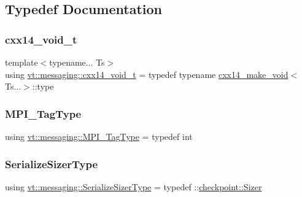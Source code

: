 \subsection{Typedef Documentation}
\mbox{\label{namespacevt_1_1messaging_a9724e719b301289eb8b3afbf9c44cf46}} 
\subsubsection{\texorpdfstring{cxx14\+\_\+void\+\_\+t}{cxx14\_void\_t}}
{\footnotesize\ttfamily template$<$typename... Ts$>$ \\
using \hyperlink{namespacevt_1_1messaging_a9724e719b301289eb8b3afbf9c44cf46}{vt\+::messaging\+::cxx14\+\_\+void\+\_\+t} = typedef typename \hyperlink{structvt_1_1messaging_1_1cxx14__make__void}{cxx14\+\_\+make\+\_\+void}$<$Ts...$>$\+::type}

\mbox{\label{namespacevt_1_1messaging_af700cb74b7b97c1a305267a9eb3ba91a}} 
\subsubsection{\texorpdfstring{M\+P\+I\+\_\+\+Tag\+Type}{MPI\_TagType}}
{\footnotesize\ttfamily using \hyperlink{namespacevt_1_1messaging_af700cb74b7b97c1a305267a9eb3ba91a}{vt\+::messaging\+::\+M\+P\+I\+\_\+\+Tag\+Type} = typedef int}

\mbox{\label{namespacevt_1_1messaging_ad46de1ccda6ed95e8bb11e85c28be878}} 
\subsubsection{\texorpdfstring{Serialize\+Sizer\+Type}{SerializeSizerType}}
{\footnotesize\ttfamily using \hyperlink{namespacevt_1_1messaging_ad46de1ccda6ed95e8bb11e85c28be878}{vt\+::messaging\+::\+Serialize\+Sizer\+Type} = typedef \+::\hyperlink{structcheckpoint_1_1_sizer}{checkpoint\+::\+Sizer}}



